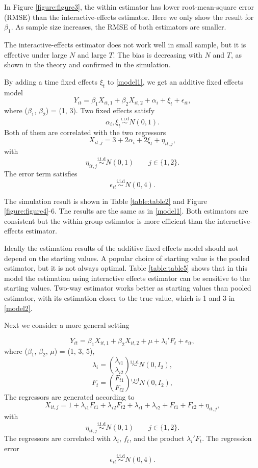 \documentclass[a4paper]{article}
\begin{document}
In Figure \ref{figure:figure3}, the within estimator has lower root-mean-square error (RMSE) than the interactive-effects estimator. Here we only show the result for $\beta_1$. As sample size increases, the RMSE of both estimators are smaller.

The interactive-effects estimator does not work well in small sample, but it is effective under large $N$ and large $T$. The bias is decreasing with $N$ and $T$, as shown in the theory and confirmed in the simulation.

By adding a time fixed effects $\xi_{t}$ to  \eqref{model1}, we get an additive fixed effects model
\begin{equation}\label{model2}
    Y_{it} = \beta_{1}X_{it,1}+\beta_{2}X_{it,2}+\alpha_{i}+\xi_{t}+\epsilon_{it},
\end{equation}
where ($\beta_1$, $\beta_2$) = (1, 3). Two fixed effects satisfy $$\alpha_{i}, \xi_{t}\stackrel{\text{i.i.d}}{\sim}N(0,1).$$ Both of them are correlated with the two regressors
\[
    X_{it,j}=3+2\alpha_i+2\xi_t+\eta_{it,j},
\] with
\[
    \eta_{it,j}\stackrel{\text{i.i.d}}{\sim} N(0,1) \qquad j\in \{1,2\}.
\] The error term satisfies $$\epsilon_{it}\stackrel{\text{i.i.d}}{\sim} N(0,4).$$

The simulation result is shown in Table \ref{table:table2} and Figure \ref{figure:figure4}-6. The results are the same as in \eqref{model1}. Both estimators are consistent but the within-group
estimator is more efficient than the interactive-effects estimator.

Ideally the estimation results of the additive fixed effects model should not depend on the starting values. A popular choice of starting value is the pooled estimator, but it is not always optimal. Table \ref{table:table5} shows that in this model the estimation using interactive effects estimator can be sensitive to the starting values. Two-way estimator works better as starting values than pooled estimator, with its estimation closer to the true value, which is 1 and 3 in  \eqref{model2}.

Next we consider a more general setting

\begin{equation}\label{model3}
    Y_{it} = \beta_{1}X_{it,1}+\beta_{2}X_{it,2}+ \mu+\lambda_{i}'F_{t}+\epsilon_{it},
\end{equation}
where ($\beta_1$, $\beta_2$, $\mu$) = (1, 3, 5),
\[
    \lambda_i = \binom{\lambda_{i1}}{\lambda_{i2}} \stackrel{\text{i.i.d}}{\sim} N(0,I_2),
\]
\[
    F_t =\binom{F_{t1}}{F_{t2}}\stackrel{\text{i.i.d}}{\sim}  N(0,I_2),
\]
The regressors are generated according to
 $$X_{it,j}= 1+\lambda_{i1}F_{t1}+\lambda_{i2}F_{t2}+\lambda_{i1}+\lambda_{i2}+F_{t1}+F_{t2}+\eta_{it,j},$$
 with $$\eta_{it,j}\stackrel{\text{i.i.d}}{\sim} N(0,1) \qquad j\in \{1,2\}.$$ The regressors are correlated with $\lambda_i$, $f_t$, and the product $ \lambda_i' F_t$. The regression error $$\epsilon_{it} \stackrel{\text{i.i.d}}{\sim}N(0,4).$$
\end{document}
